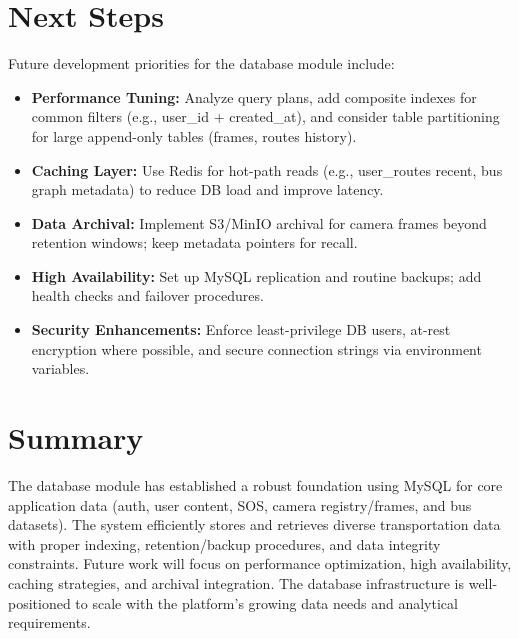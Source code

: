 \section{Next Steps}

Future development priorities for the database module include:

\begin{itemize}
    \item \textbf{Performance Tuning:} Analyze query plans, add composite indexes for common filters (e.g., user\_id + created\_at), and consider table partitioning for large append-only tables (frames, routes history).
    
    \item \textbf{Caching Layer:} Use Redis for hot-path reads (e.g., user\_routes recent, bus graph metadata) to reduce DB load and improve latency.
    
    \item \textbf{Data Archival:} Implement S3/MinIO archival for camera frames beyond retention windows; keep metadata pointers for recall.
    
    \item \textbf{High Availability:} Set up MySQL replication and routine backups; add health checks and failover procedures.
    
    \item \textbf{Security Enhancements:} Enforce least-privilege DB users, at-rest encryption where possible, and secure connection strings via environment variables.
\end{itemize}

\section{Summary}

The database module has established a robust foundation using MySQL for core application data (auth, user content, SOS, camera registry/frames, and bus datasets). The system efficiently stores and retrieves diverse transportation data with proper indexing, retention/backup procedures, and data integrity constraints. Future work will focus on performance optimization, high availability, caching strategies, and archival integration. The database infrastructure is well-positioned to scale with the platform's growing data needs and analytical requirements.
